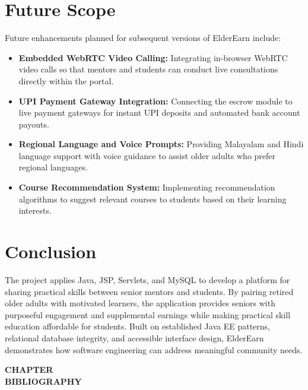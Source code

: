 \documentclass[12pt,a4paper]{report}
\newcommand{\chaptertitlepage}[1]{%
  \clearpage
  \thispagestyle{empty}
  \null
  \vfill
  \begin{center}
    {\fontsize{16pt}{18pt}\selectfont\bfseries CHAPTER \thechapter}\\[0.5cm]
    {\fontsize{16pt}{18pt}\selectfont\bfseries #1}
  \end{center}
  \vfill
  \null
  \clearpage
  \setcounter{section}{0}
}
\begin{document}
\section{Future Scope}
Future enhancements planned for subsequent versions of ElderEarn include:
\begin{itemize}[leftmargin=1.5em, itemsep=2pt]
  \item \textbf{Embedded WebRTC Video Calling:} Integrating in-browser WebRTC video calls so that mentors and students can conduct live consultations directly within the portal.
  \item \textbf{UPI Payment Gateway Integration:} Connecting the escrow module to live payment gateways for instant UPI deposits and automated bank account payouts.
  \item \textbf{Regional Language and Voice Prompts:} Providing Malayalam and Hindi language support with voice guidance to assist older adults who prefer regional languages.
  \item \textbf{Course Recommendation System:} Implementing recommendation algorithms to suggest relevant courses to students based on their learning interests.
\end{itemize}

\section{Conclusion}
The project applies Java, JSP, Servlets, and MySQL to develop a platform for sharing practical skills between senior mentors and students. By pairing retired older adults with motivated learners, the application provides seniors with purposeful engagement and supplemental earnings while making practical skill education affordable for students. Built on established Java EE patterns, relational database integrity, and accessible interface design, ElderEarn demonstrates how software engineering can address meaningful community needs.

\chaptertitlepage{BIBLIOGRAPHY}
\end{document}
